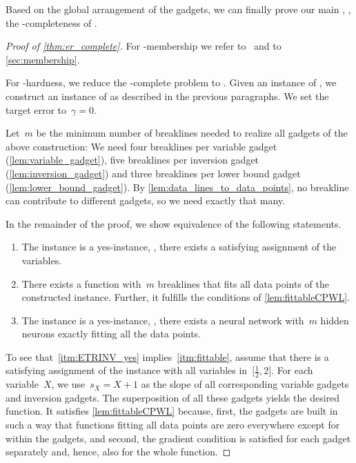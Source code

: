 Based on the global arrangement of the gadgets, we can finally prove our main , \ie, the \ER-completeness of \trainNN.

\begin{proof}[Proof of \cref{thm:er_complete}]
    For \ER-membership we refer to~\cite{Abrahamsen2021_NeuralNetworks} and to \cref{sec:membership}.
    
    For \ER-hardness, we reduce the \ER-complete problem \ETRINV to \trainNN.
    Given an instance of \ETRINV, we construct an instance of \trainNN as described in the previous paragraphs.
    We set the target error to~$\gamma = 0$.

    Let~$m$ be the minimum number of breaklines needed to realize all gadgets of the above construction:
    We need four breaklines per variable gadget (\cref{lem:variable_gadget}), five breaklines per inversion gadget (\cref{lem:inversion_gadget}) and three breaklines per lower bound gadget (\cref{lem:lower_bound_gadget}).
    By \cref{lem:data_lines_to_data_points}, no breakline can contribute to different gadgets, so we need exactly that many.

    In the remainder of the proof, we show equivalence of the following statements.
    \begin{enumerate}[label=(\arabic*)]
        \item\label{itm:ETRINV_yes}
        The \ETRINV instance is a yes-instance, \ie, there exists a satisfying assignment of the variables.

        \item\label{itm:fittable}
        There exists a \CPWL function with~$m$ breaklines that fits all data points of the constructed \trainNN instance.
        Further, it fulfills the conditions of \cref{lem:fittableCPWL}.

        \item\label{itm:trainNN_yes}
        The \trainNN instance is a yes-instance, \ie, there exists a \fullyconnected \twolayer neural network with~$m$ hidden \ReLU neurons exactly fitting all the data points.
    \end{enumerate}

    To see that~\ref{itm:ETRINV_yes} implies~\ref{itm:fittable}, assume that there is a satisfying assignment of the \ETRINV instance with all variables in~$\bigl[\frac{1}{2}, 2\bigr]$.
    For each variable~$X$, we use~$s_X = X + 1$ as the slope of all corresponding variable gadgets and inversion gadgets.
    The superposition of all these gadgets yields the desired \CPWL function.
    It satisfies \cref{lem:fittableCPWL} because, first, the gadgets are built in such a way that functions fitting all data points are %
zero everywhere except for within the gadgets, and second, the gradient condition is satisfied for each gadget separately and, hence, also for the whole function.


\end{proof}
